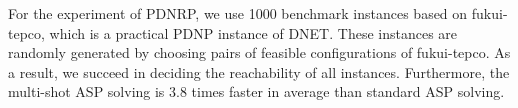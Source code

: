 \documentclass[dvipdfmx,a4paper]{jsarticle}
\begin{document}
For the experiment of PDNRP, we use 1000 benchmark instances based on
\textsf{fukui-tepco}, which is a practical PDNP instance of DNET.
%
These instances are randomly generated by choosing pairs of feasible
configurations of \textsf{fukui-tepco}.
%
As a result, we succeed in deciding the reachability of all instances.
%
Furthermore, the multi-shot ASP solving is 3.8 times faster in average
than standard ASP solving.

\end{document}
